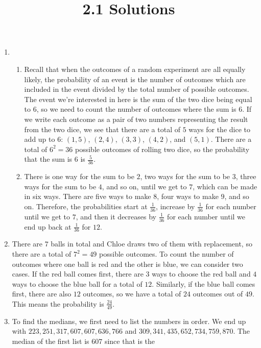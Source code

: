 \documentclass{article}
\title{2.1 Solutions}
\author{}
\date{}
\begin{document}
\maketitle

\begin{enumerate}
	\item \begin{enumerate}
			\item Recall that when the outcomes of a random experiment are all 
				equally likely, the probability of an event is the number of 
				outcomes which are included in the event divided by the total 
				number of possible outcomes. The event we're interested in here 
				is the sum of the two dice being equal to $6$, so we need to 
				count the number of outcomes where the sum is $6$. If we write 
				each outcome as a pair of two numbers representing the result 
				from the two dice, we see that there are a total of $5$ ways for 
				the dice to add up to $6$: $(1, 5)$, $(2, 4)$, $(3, 3)$, $(4, 
				2)$, and $(5, 1)$. There are a total of $6^2 = 36$ possible 
				outcomes of rolling two dice, so the probability that the sum is 
				$6$ is $\frac{5}{36}$.
			\item There is one way for the sum to be $2$, two ways for the sum 
				to be $3$, three ways for the sum to be $4$, and so on, until we 
				get to $7$, which can be made in six ways. There are five ways 
				to make $8$, four ways to make $9$, and so on. Therefore, the 
				probabilities start at $\frac{1}{36}$, increase by 
				$\frac{1}{36}$ for each number until we get to $7$, and then it 
				decreases by $\frac{1}{36}$ for each number until we end up back 
				at $\frac{1}{36}$ for $12$.
		\end{enumerate}
	\item There are $7$ balls in total and Chloe draws two of them with 
		replacement, so there are a total of $7^2 = 49$ possible outcomes. To 
		count the number of outcomes where one ball is red and the other is 
		blue, we can consider two cases. If the red ball comes first, there are 
		$3$ ways to choose the red ball and $4$ ways to choose the blue ball for 
		a total of $12$. Similarly, if the blue ball comes first, there are also 
		$12$ outcomes, so we have a total of $24$ outcomes out of $49$. This 
		means the probability is $\frac{24}{49}$.
	\item To find the medians, we first need to list the numbers in order. We 
		end up with $223, 251, 317, 607, 607, 636, 766$ and $309, 341, 435, 652, 
		734, 759, 870$. The median of the first list is $607$ since that is the 

\end{enumerate}
\end{document}
